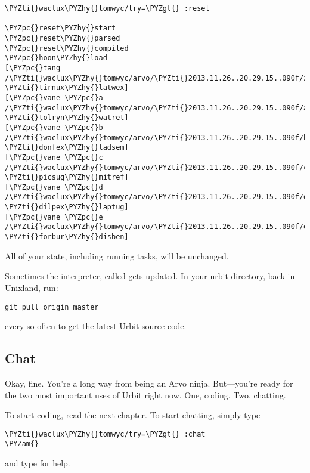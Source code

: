 \begin{framed_shaded}
\begin{Verbatim}[fontsize=\relsize{-2.5},fontseries=b,commandchars=\\\{\}]
\PYZti{}waclux\PYZhy{}tomwyc/try=\PYZgt{} :reset

\PYZpc{}reset\PYZhy{}start
\PYZpc{}reset\PYZhy{}parsed
\PYZpc{}reset\PYZhy{}compiled
\PYZpc{}hoon\PYZhy{}load
[\PYZpc{}tang /\PYZti{}waclux\PYZhy{}tomwyc/arvo/\PYZti{}2013.11.26..20.29.15..090f/zuse \PYZti{}tirnux\PYZhy{}latwex]
[\PYZpc{}vane \PYZpc{}a /\PYZti{}waclux\PYZhy{}tomwyc/arvo/\PYZti{}2013.11.26..20.29.15..090f/ames \PYZti{}tolryn\PYZhy{}watret]
[\PYZpc{}vane \PYZpc{}b /\PYZti{}waclux\PYZhy{}tomwyc/arvo/\PYZti{}2013.11.26..20.29.15..090f/batz \PYZti{}donfex\PYZhy{}ladsem]
[\PYZpc{}vane \PYZpc{}c /\PYZti{}waclux\PYZhy{}tomwyc/arvo/\PYZti{}2013.11.26..20.29.15..090f/clay \PYZti{}picsug\PYZhy{}mitref]
[\PYZpc{}vane \PYZpc{}d /\PYZti{}waclux\PYZhy{}tomwyc/arvo/\PYZti{}2013.11.26..20.29.15..090f/dill \PYZti{}dilpex\PYZhy{}laptug]
[\PYZpc{}vane \PYZpc{}e /\PYZti{}waclux\PYZhy{}tomwyc/arvo/\PYZti{}2013.11.26..20.29.15..090f/eyre \PYZti{}forbur\PYZhy{}disben]
\end{Verbatim}
\end{framed_shaded}
All of your state, including running tasks, will be unchanged.

Sometimes the interpreter, called  gets updated. In your urbit directory, back in Unixland, run:

\begin{framed_shaded}
\begin{Verbatim}[fontsize=\relsize{-2.5},fontseries=b,commandchars=\\\{\}]
git pull origin master
\end{Verbatim}
\end{framed_shaded}
every so often to get the latest Urbit source code.

\subsection{Chat}

Okay, fine.  You're a long way from being an Arvo ninja.  But---you're ready for the two most important uses of Urbit right now.
One, coding.  Two, chatting.

To start coding, read the next chapter.  To start chatting,
simply type

\begin{framed_shaded}
\begin{Verbatim}[fontsize=\relsize{-2.5},fontseries=b,commandchars=\\\{\}]
\PYZti{}waclux\PYZhy{}tomwyc/try=\PYZgt{} :chat
\PYZam{}
\end{Verbatim}
\end{framed_shaded}
and type  for help.